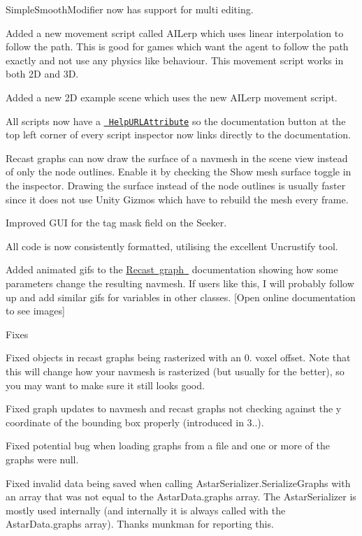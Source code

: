 \begin{DoxyItemize}
\begin{DoxyItemize}
\begin{DoxyItemize}
\item Simple\+Smooth\+Modifier now has support for multi editing.
\item Added a new movement script called A\+I\+Lerp which uses linear interpolation to follow the path. This is good for games which want the agent to follow the path exactly and not use any physics like behaviour. This movement script works in both 2D and 3D.
\item Added a new 2D example scene which uses the new A\+I\+Lerp movement script.
\item All scripts now have a \href{http://docs.unity3d.com/ScriptReference/HelpURLAttribute.html}{\texttt{ Help\+U\+R\+L\+Attribute}} so the documentation button at the top left corner of every script inspector now links directly to the documentation.
\item Recast graphs can now draw the surface of a navmesh in the scene view instead of only the node outlines. Enable it by checking the \textquotesingle{}Show mesh surface\textquotesingle{} toggle in the inspector. Drawing the surface instead of the node outlines is usually faster since it does not use Unity Gizmos which have to rebuild the mesh every frame.
\item Improved G\+UI for the tag mask field on the Seeker.
\item All code is now consistently formatted, utilising the excellent Uncrustify tool.
\item Added animated gifs to the \mbox{\hyperlink{}{Recast graph }} documentation showing how some parameters change the resulting navmesh. If users like this, I will probably follow up and add similar gifs for variables in other classes. \mbox{[}Open online documentation to see images\mbox{]}
\end{DoxyItemize}
\item Fixes
\begin{DoxyItemize}
\item Fixed objects in recast graphs being rasterized with an 0. voxel offset. Note that this will change how your navmesh is rasterized (but usually for the better), so you may want to make sure it still looks good.
\item Fixed graph updates to navmesh and recast graphs not checking against the y coordinate of the bounding box properly (introduced in 3..).
\item Fixed potential bug when loading graphs from a file and one or more of the graphs were null.
\item Fixed invalid data being saved when calling Astar\+Serializer.\+Serialize\+Graphs with an array that was not equal to the Astar\+Data.\+graphs array. The Astar\+Serializer is mostly used internally (and internally it is always called with the Astar\+Data.\+graphs array). Thanks munkman for reporting this.

\end{DoxyItemize}
\end{DoxyItemize}
\end{DoxyItemize}
